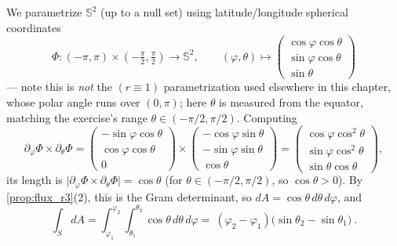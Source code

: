 \begin{exercisesolution}
We parametrize $\mathbb{S}^2$ (up to a null set) using latitude/longitude spherical
coordinates
\[\Phi : (-\pi,\pi)\times\left(-\tfrac\pi2,\tfrac\pi2\right) \to \mathbb{S}^2, \qquad
  (\varphi,\theta) \mapsto \begin{pmatrix}\cos\varphi\cos\theta\\ \sin\varphi\cos\theta\\
  \sin\theta\end{pmatrix}\]
--- note this is \emph{not} the $(r\equiv1)$ parametrization used elsewhere in this chapter,
whose polar angle runs over $(0,\pi)$; here $\theta$ is measured from the equator, matching
the exercise's range $\theta\in(-\pi/2,\pi/2)$. Computing
\[\partial_\varphi\Phi\times\partial_\theta\Phi = \begin{pmatrix}-\sin\varphi\cos\theta\\
  \cos\varphi\cos\theta\\ 0\end{pmatrix} \times \begin{pmatrix}-\cos\varphi\sin\theta\\
  -\sin\varphi\sin\theta\\ \cos\theta\end{pmatrix} = \begin{pmatrix}\cos\varphi\cos^2\theta\\
  \sin\varphi\cos^2\theta\\ \sin\theta\cos\theta\end{pmatrix},\]
its length is $\lvert\partial_\varphi\Phi\times\partial_\theta\Phi\rvert = \cos\theta$ (for
$\theta\in(-\pi/2,\pi/2)$, so $\cos\theta>0$). By \cref{prop:flux_r3}(2), this is the Gram
determinant, so $dA = \cos\theta\,d\theta\,d\varphi$, and
\[\int_S dA = \int_{\varphi_1}^{\varphi_2}\!\!\int_{\theta_1}^{\theta_2} \cos\theta\,d\theta\,
  d\varphi = \boxed{\ (\varphi_2-\varphi_1)\big(\sin\theta_2-\sin\theta_1\big)\ }.\]
\end{exercisesolution}


